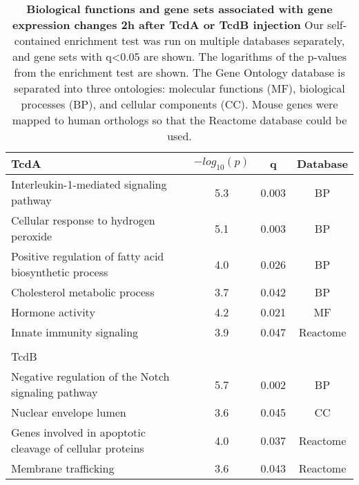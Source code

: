 \begin{table}[h!]
\begin{center}
\begin{tabular}{ l c c c }
TcdA & $-log_{10}(p)$ & q & Database \\ \hline
Interleukin-1-mediated signaling pathway & 5.3 & 0.003 & BP \\
Cellular response to hydrogen peroxide & 5.1 & 0.003 & BP \\
Positive regulation of fatty acid biosynthetic process & 4.0 & 0.026 & BP \\
Cholesterol metabolic process & 3.7 & 0.042 & BP \\
Hormone activity & 4.2 & 0.021 & MF \\
Innate immunity signaling & 3.9 & 0.047 & Reactome \\
 & & & \\
TcdB & & & \\ \hline
Negative regulation of the Notch signaling pathway & 5.7 & 0.002 & BP \\
Nuclear envelope lumen & 3.6 & 0.045 & CC \\
Genes involved in apoptotic cleavage of cellular proteins & 4.0 & 0.037 & Reactome \\
Membrane trafficking & 3.6 & 0.043 & Reactome \\
\end{tabular}
\caption[Biological functions and gene sets associated with gene expression changes 2h after TcdA or TcdB injection]{
 \textbf{Biological functions and gene sets associated with gene expression changes 2h after TcdA or TcdB injection}
Our self-contained enrichment test was run on multiple databases separately, and gene sets with q<0.05 are shown. The logarithms of the p-values from the enrichment test are shown. The Gene Ontology database is separated into three ontologies: molecular functions (MF), biological processes (BP), and cellular components (CC). Mouse genes were mapped to human orthologs so that the Reactome database could be used.}
\label{ini:table2}
\end{center}
\end{table}


